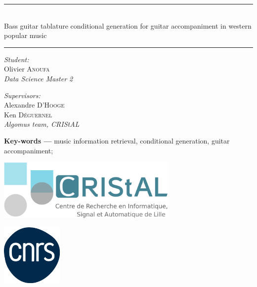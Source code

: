 \begin{titlepage}
\begin{minipage}{\linewidth}
\huge
\bfseries
\centering
\rule{\linewidth}{1.5pt}\\
Bass guitar tablature conditional generation for guitar accompaniment in western popular music\\[-3mm]
\rule{\linewidth}{1.5pt}
\end{minipage}

\vfill

\begin{minipage}{.45\linewidth}
\textit{Student:}\\
Olivier \textsc{Anoufa}\\
\textit{Data Science Master 2}

\end{minipage}
\hfill
\begin{minipage}{.45\linewidth}
\flushright
\textit{Supervisors:}\\
Alexandre \textsc{D'Hooge}\\
Ken \textsc{Déguernel}\\
\textit{Algomus team, CRIStAL}
\end{minipage}

\vfill

\begin{flushleft}
\centering
\textbf{Key-words ---} music information retrieval, conditional generation, guitar accompaniment;
\vspace{.5\baselineskip}\\
\end{flushleft}
\vfill

\begin{minipage}{.25\linewidth}
\includegraphics[height=3cm]{figs/logoCRIStAL.png}
\end{minipage}
\hspace{7cm}
\begin{minipage}{.25\linewidth}
\includegraphics[height=3cm]{figs/cnrs.png}
\end{minipage}

\end{titlepage}
